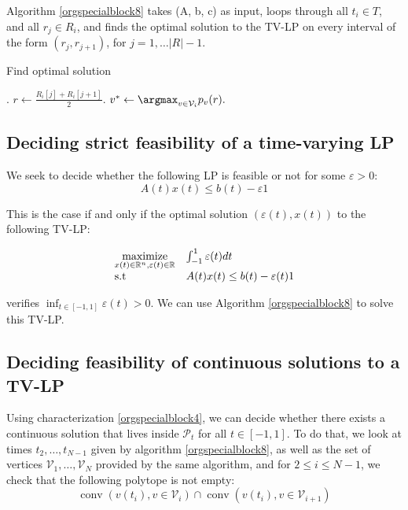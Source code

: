 \documentclass[moor]{informs1}
\begin{document}
Algorithm \ref{orgspecialblock8} takes (A, b, c) as input, loops through all \(t_i \in T\), and all \(r_j \in R_i\), and finds the optimal solution to the TV-LP on every interval of the form \((r_j, r_{j+1})\), for \(j=1, \ldots |R|-1\).

\begin{algorithm}
\caption{Find optimal solution}
\begin{algorithmic}[1]
\State {}.
\label{alg:continuousfor}
\State $r \gets \frac{R_i[j] + R_i[j+1]}2.$
\State $v^* \gets \argmax_{v \in \mathcal V_i} p_v(r).$
\State {}
\EndFor
\EndFor
\EndProcedure
\end{algorithmic}
\label{orgspecialblock8}

\end{algorithm}
\newpage


\subsection{Deciding strict feasibility of a time-varying LP}
\label{sec:orgheadline13}
\label{orgtarget4}
We seek to decide whether the following LP is feasible or not for some \(\varepsilon > 0\):
$$A(t)x(t) \le b(t) - \varepsilon 1$$

This is the case if and only if the optimal solution \((\varepsilon(t), x(t))\) to the following TV-LP:

\begin{equation*}   
\begin{array}{ll@{}ll}
\underset{x(t) \in \mathbb R^n, \varepsilon(t) \in \mathbb R}{\text{maximize}} & \int_{-1}^1 \varepsilon(t) dt & \\
\text{s.t}& A(t)x(t) \le b(t) - \varepsilon(t) 1
\end{array}
\end{equation*}

verifies \(\inf_{t \in [-1, 1]} \varepsilon(t) > 0\). We can use Algorithm \ref{orgspecialblock8} to solve this TV-LP.
\newpage


\subsection{Deciding feasibility of continuous solutions to a TV-LP}
\label{sec:orgheadline14}
\label{orgtarget5}
Using characterization \ref{orgspecialblock4}, we can decide whether there exists a continuous solution that lives inside \(\mathcal P_t\) for all \(t \in [-1, 1]\). To do that, we look at times \(t_{2}, \ldots, t_{N-1}\) given by algorithm \ref{orgspecialblock8}, as well as the set of vertices \(\mathcal V_1, \ldots, \mathcal V_N\) provided by the same algorithm, and for \(2 \le i \le N-1\), we check that the following polytope is not empty:
$$\operatorname{conv}(v(t_i), v \in \mathcal V_i) \cap \operatorname{conv}(v(t_i), v \in \mathcal V_{i+1})$$
\end{document}
